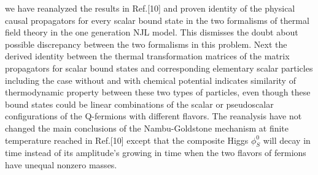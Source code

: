 \documentclass[twocolumn,prd,showpacs,a4paper]{revtex4}
\begin{document}
we have reanalyzed the results in Ref.[10] and proven identity of the physical causal 
propagators for every scalar bound state in the two formalisms of thermal field theory 
in the one generation NJL model. This dismisses the doubt about possible discrepancy 
between the two formalisms in this problem. Next the derived identity between the 
thermal transformation matrices of the matrix propagators for scalar bound states 
and corresponding elementary scalar particles including the case without and with 
chemical potential indicates similarity of thermodynamic property between these two 
types of particles, even though these bound states could be linear combinations of 
the scalar or pseudoscalar configurations of the Q-fermions with different flavors. 
The reanalysis have not changed the main conclusions of the Nambu-Goldstone mechanism 
at finite temperature reached in Ref.[10] except that the composite Higgs $\phi_S^0$ 
will decay in time instead of its amplitude's growing in time when the two flavors 
of fermions have unequal nonzero masses. 
 
\end{document}
